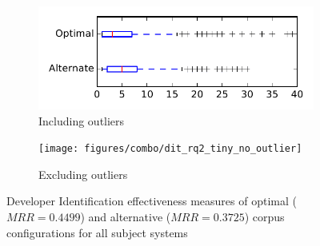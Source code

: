 
\begin{figure}
    \centering
    \begin{subfigure}{.4\textwidth}
        \centering
        \includegraphics[height=0.4\textheight]{figures/combo/dit_rq2_tiny}
        \caption{Including outliers}\label{fig:combo:dit:rq2:tiny_outlier}
    \end{subfigure}%
    \begin{subfigure}{.4\textwidth}
        \centering
        \texttt{[image: figures/combo/dit\_rq2\_tiny\_no\_outlier]}
        \caption{Excluding outliers}\label{fig:combo:dit:rq2:tiny_no_outlier}
    \end{subfigure}
\caption{Developer Identification effectiveness measures of optimal ($MRR=0.4499$) and alternative ($MRR=0.3725$) corpus configurations for all subject systems}
\label{fig:combo:dit:rq2:tiny}
\end{figure}
